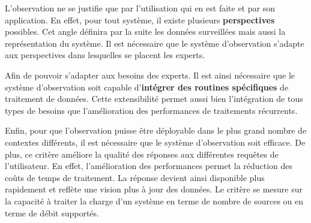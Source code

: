L'observation ne se justifie que par l'utilisation qui en est faite et par son application. En effet, pour tout système, il existe plusieurs \textbf{perspectives} possibles. Cet angle définira par la suite les données surveillées mais aussi la représentation du système. Il est nécessaire que le système d'observation s'adapte aux perspectives dans lesquelles se placent les experts.

Afin de pouvoir s'adapter aux besoins des experts. Il est ainsi nécessaire que le système d'observation soit capable d'\textbf{intégrer des routines spécifiques} de traitement de données. Cette extensibilité permet aussi bien l'intégration de tous types de besoins que l'amélioration des performances de traitements récurrents.

Enfin, pour que l'observation puisse être déployable dans le plus grand nombre de contextes différents, il est nécessaire que le système d'observation soit efficace. De plus, ce critère améliore la qualité des réponses aux différentes requêtes de l'utilisateur. En effet, l'amélioration des performances permet la réduction des coûts de temps de traitement. La réponse devient ainsi disponible plus rapidement et reflète une vision plus à jour des données. Le critère se mesure sur la capacité à traiter la charge d'un système en terme de nombre de sources ou en terme de débit supportés.

